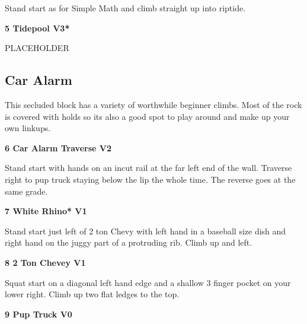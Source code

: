 \begin{multicols}{2}
\begin{adjustwidth}{0.5cm}{}
							\begin{adjustwidth}{0.5cm}{}				
							Stand start as for Simple Math and climb straight up into riptide.
							\end{adjustwidth}
						\end{adjustwidth}
					\label{rt:Tidepool}
\colorbox{green!20}{
\parbox{0.95\linewidth}{
\textbf{
5 Tidepool V3*  
}
}
}

					\begin{adjustwidth}{0.5cm}{}				
					PLACEHOLDER
					\end{adjustwidth}

			\subsection*{Car Alarm}\label{bf:Car Alarm}
			This secluded block has a variety of worthwhile beginner climbs. Most of the rock is covered with holds so its also a good spot to play around and make up your own linkups.\\
			
					\label{rt:Car Alarm Traverse}
\colorbox{green!20}{
\parbox{0.95\linewidth}{
\textbf{
6 Car Alarm Traverse V2    
}
}
}

					\begin{adjustwidth}{0.5cm}{}				
					Stand start with hands on an incut rail at the far left end of the wall. Traverse right to pup truck staying below the lip the whole time. The reverse goes at the same grade.
					\end{adjustwidth}
					\label{rt:White Rhino}
\colorbox{green!20}{
\parbox{0.95\linewidth}{
\textbf{
7 White Rhino* V1   
}
}
}

					\begin{adjustwidth}{0.5cm}{}				
					Stand start just left of 2 ton Chevy with left hand in a baseball size dish and right hand on the juggy part of a protruding rib. Climb up and left.
					\end{adjustwidth}
					\label{rt:2 Ton Chevey}
\colorbox{green!20}{
\parbox{0.95\linewidth}{
\textbf{
8 2 Ton Chevey V1    
}
}
}

					\begin{adjustwidth}{0.5cm}{}				
					Squat start on a diagonal left hand edge and a shallow 3 finger pocket on your lower right. Climb up two flat ledges to the top.
					\end{adjustwidth}
					\label{rt:Pup Truck}
\colorbox{green!20}{
\parbox{0.95\linewidth}{
\textbf{
9 Pup Truck V0    
}
}
}


\end{multicols}
